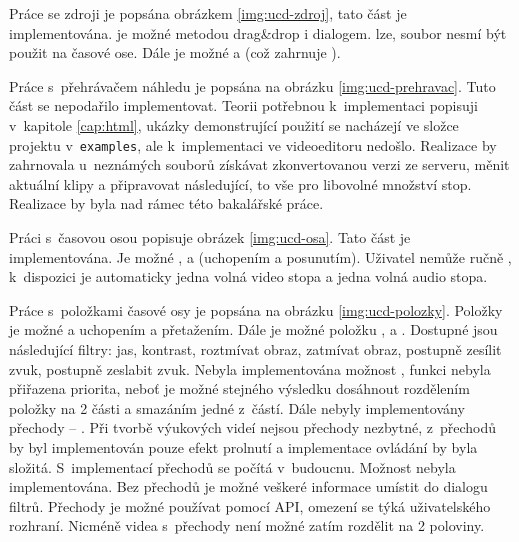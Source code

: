 Práce se zdroji je popsána obrázkem \ref{img:ucd-zdroj}, tato část je implementována.  je možné metodou drag\&drop i dialogem.  lze, soubor nesmí být použit na časové ose. Dále je možné  a  (což zahrnuje ).

Práce s~přehrávačem náhledu je popsána na obrázku \ref{img:ucd-prehravac}. Tuto část se nepodařilo implementovat. Teorii potřebnou k~implementaci popisuji v~kapitole \ref{cap:html}, ukázky demonstrující použití se nacházejí ve složce projektu v~\texttt{examples}, ale k~implementaci ve videoeditoru nedošlo. Realizace by zahrnovala u~neznámých souborů získávat zkonvertovanou verzi ze serveru, měnit aktuální klipy a připravovat následující, to vše pro libovolné množství stop. Realizace by byla nad rámec této bakalářské práce.

Práci s~časovou osou popisuje obrázek \ref{img:ucd-osa}. Tato část je implementována. Je možné ,  a  (uchopením a posunutím). Uživatel nemůže ručně , k~dispozici je automaticky jedna volná video stopa a jedna volná audio stopa.

Práce s~položkami časové osy je popsána na obrázku \ref{img:ucd-polozky}. Položky je možné  a  uchopením a přetažením. Dále je možné položku ,  a . Dostupné jsou následující filtry: jas, kontrast, roztmívat obraz, zatmívat obraz, postupně zesílit zvuk, postupně zeslabit zvuk. Nebyla implementována možnost , funkci nebyla přiřazena priorita, neboť je možné stejného výsledku dosáhnout rozdělením položky na 2 části a smazáním jedné z~částí. Dále nebyly implementovány přechody -- . Při tvorbě výukových videí nejsou přechody nezbytné, z~přechodů by byl implementován pouze efekt prolnutí a implementace ovládání by byla složitá. S~implementací přechodů se počítá v~budoucnu. Možnost  nebyla implementována. Bez přechodů je možné veškeré informace umístit do dialogu filtrů. Přechody je možné používat pomocí API, omezení se týká uživatelského rozhraní. Nicméně videa s~přechody není možné zatím rozdělit na 2 poloviny.

